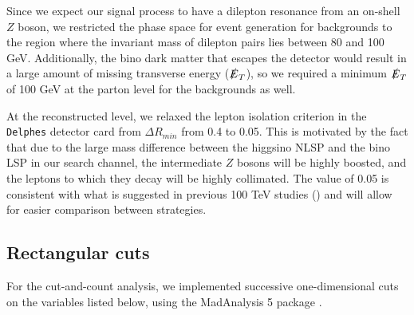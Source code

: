 Since we expect our signal process to have a dilepton resonance from an on-shell $Z$ boson, we restricted the phase space for event generation for backgrounds to the region where the invariant mass of dilepton pairs lies between 80 and 100 GeV. Additionally, the bino dark matter that escapes the detector would result in a large amount of missing transverse energy ($\slashed{E}_T$), so we required a minimum $\slashed{E}_T$ of 100 GeV at the parton level for the backgrounds as well. 

At the reconstructed level, we relaxed the lepton isolation criterion in the \texttt{Delphes} detector card from $\Delta R_{min}$ from 0.4 to 0.05. This is motivated by the fact that due to the large mass difference between the higgsino NLSP and the bino LSP in our search channel, the intermediate $Z$ bosons will be highly boosted, and the leptons to which they decay will be highly collimated. The value of 0.05 is consistent with what is suggested in previous 100 TeV studies (\citep{Acharya2014,Gori:2014oua,Bramante2015}) and will allow for easier comparison between strategies.


\subsection{Rectangular cuts}\label{event-selection}

For the cut-and-count analysis, we implemented successive one-dimensional cuts on the variables listed below, using the MadAnalysis 5 package \citep{Conte2013}.

